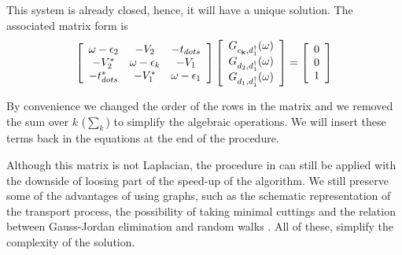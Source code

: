
 \noindent This system is already closed, hence, it will have a unique solution. The associated matrix form is  \begin{equation}
% 
% 
\left[\begin{array}{ccc}
\omega-\epsilon_{2} & -V_{2} & -t_{dots}\\
-V_{2}^{*} & \omega-\epsilon_{k} & -V_{1}\\
-t_{dots}^{*} & -V_{1}^{*} & \omega-\epsilon_{1}
\end{array}\right]\left[\begin{array}{c}
\Green{c_{\mathbf{k}},d_{1}^{\dagger}}\\
\Green{d_2,d_{1}^{\dagger}}\\
\Green{d_{1},d_{1}^{\dagger}}
\end{array}\right]=\left[\begin{array}{c}
0\\
0\\
1
\end{array}\right]
\label{eq:MatrixDQD}
 \end{equation}
 
\noindent By convenience we changed the order of the rows in the matrix and we removed the sum over $k$ ($\sum_k$) to simplify the algebraic operations. We will insert these terms back in the equations at the end of the procedure.

Although this matrix is not Laplacian, the procedure in \cite{spielman10}  can still be applied with the downside of loosing part of the  speed-up of the algorithm. We still preserve  some of the advantages of using graphs, such as the schematic representation of the transport process,  the possibility of taking minimal cuttings and the relation between Gauss-Jordan elimination and random walks \cite{spielman10}  . All of these, simplify the complexity of the solution. 
 
